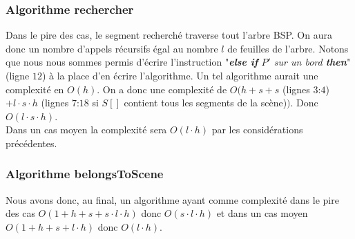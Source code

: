 \documentclass[10pt]{article}
\begin{document}
\subsubsection{Algorithme rechercher}
Dans le pire des cas, le segment recherché traverse tout l'arbre BSP. On aura donc un nombre d'appels récursifs égal au nombre $l$ de feuilles de l'arbre. Notons que nous nous sommes permis d'écrire l'instruction "\emph{\textbf{else if }$P'$ sur un bord \textbf{then}}" (ligne $12$) à la place d'en écrire l'algorithme. Un tel algorithme aurait une complexité en $O(h)$. On a donc une complexité de $O(h+s+s$ (lignes $3$:$4$) $+ l\cdot s\cdot h$ (lignes $7$:$18$ si $S[]$ contient tous les segments de la scène)$)$. Donc $O(l\cdot s\cdot h)$.\\[.5cm]
Dans un cas moyen la complexité sera $O(l\cdot h)$ par les considérations précédentes.
\subsubsection{Algorithme belongsToScene}
Nous avons donc, au final, un algorithme ayant comme complexité dans le pire des cas $O(1+h+s+s\cdot l\cdot h)$ donc $O(s\cdot l\cdot h)$ et dans un cas moyen $O(1+h+s+l\cdot h)$ donc $O(l\cdot h)$.
\end{document}
